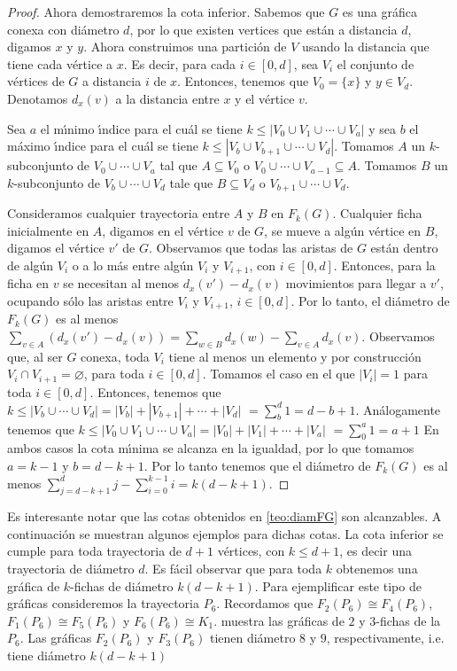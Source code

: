 \begin{proof}
Ahora demostraremos la cota inferior. Sabemos que $G$ es una gr\'afica conexa
con di\'ametro $d$, por lo que existen vertices que est\'an a distancia
$d$, digamos $x$ y $y$. Ahora construimos una partici\'on de $V$ usando  la
distancia que tiene cada v\'ertice a $x$. Es decir, para cada $i\in [0,d]$,
sea $V_{i}$ el conjunto de v\'ertices de $G$ a distancia $i$ de $x$. Entonces,
tenemos que $V_{0}=\{x\}$ y $y\in V_{d}$. Denotamos $d_x(v)$ a la distancia
entre $x$ y el v\'ertice $v$.

Sea $a$ el m\'\i{}nimo \'\i{}ndice para el cu\'al se tiene $k \leq |V_{0}\cup
V_{1}\cup \cdots \cup V_{a}|$ y sea $b$ el m\'aximo \'\i{}ndice para el cu\'al se
tiene $k\leq |V_{b}\cup V_{b+1}\cup \cdots \cup V_{d}|$. Tomamos $A$ un
$k$-subconjunto de $V_{0}\cup \cdots \cup V_{a}$  tal que $A\subseteq
V_{0}$ o $V_{0}\cup \cdots \cup V_{a-1}\subseteq A$. Tomamos $B$ un
$k$-subconjunto de $V_{b}\cup \cdots \cup V_{d}$ tale que
$B\subseteq V_{d}$ o $V_{b+1}\cup \cdots \cup V_{d}$. 

Consideramos cualquier trayectoria entre $A$ y $B$ en $F_{k}(G)$. Cualquier
ficha inicialmente en $A$, digamos en el v\'ertice $v$ de $G$, se mueve a
alg\'un v\'ertice en $B$, digamos el v\'ertice $v'$ de $G$. Observamos que todas
las aristas de $G$ est\'an dentro de alg\'un $V_{i}$ o a lo m\'as entre alg\'un
$V_{i}$ y $V_{i+1}$, con $i\in[0,d]$. Entonces, para la ficha en $v$ se
necesitan al menos $d_x(v')-d_x(v)$ movimientos para llegar a $v'$, ocupando
s\'olo las aristas entre $V_{i}$ y $V_{i+1}$, $i\in [0,d]$. Por lo tanto,
el di\'ametro de $F_{k}(G)$ es al menos $\sum_{v\in A}(d_x(v')-d_x(v))=
\sum_{w\in B}d_x(w)-\sum_{v\in A}d_x(v)$. Observamos que, al ser $G$ conexa,
toda $V_{i}$ tiene al menos un elemento y por construcci\'on $V_{i} \cap
V_{i+1}=\varnothing$, para toda $i\in [0,d]$. Tomamos el caso en el que
$|V_{i}|=1$ para toda $i\in [0,d]$. Entonces, tenemos que $k\leq
|V_{b}\cup\cdots\cup V_{d}|=|V_{b}|+|V_{b+1}|+\cdots +|V_d|$
$=\sum_{b}^{d}1 = d -b+1$. An\'alogamente tenemos que $k\leq
|V_{0}\cup V_{1}\cup \cdots \cup V_{a}|=|V_{0}|+|V_{1}|+\cdots + |V_{a}|$
$=\sum_{0}^{a} 1 = a+1$ En ambos casos la cota m\'\i{}nima se alcanza en la
igualdad, por lo que tomamos $a=k-1$ y $b=d-k+1$. Por lo tanto tenemos que
el di\'ametro de $F_{k}(G)$ es al menos $\sum_{j=d -k+1}^{d}j -
\sum_{i=0}^{k-1}i = k(d-k+1)$.
\end{proof}

Es interesante notar que las cotas obtenidos en \cref{teo:diamFG} son
alcanzables. A continuaci\'on se muestran algunos ejemplos para dichas cotas. La
cota inferior se cumple para toda trayectoria de $d +1$ v\'ertices, con $k \leq
d +1$, es decir una trayectoria de di\'ametro $d$. Es f\'acil observar que para
toda $k$ obtenemos una gr\'afica de $k$-fichas de di\'ametro $k(d-k+1)$. Para
ejemplificar este tipo de gr\'aficas consideremos la trayectoria $P_6$.
Recordamos que $F_2(P_6) \cong F_4(P_6)$, $F_1(P_6) \cong F_5(P_6)$ y $F_6(P_6)
\cong K_1$.  muestra las gr\'aficas de $2$ y
$3$-fichas de la $P_6$. Las gr\'aficas $F_2(P_6)$ y $F_3(P_6)$ tienen di\'ametro
$8$ y $9$, respectivamente, i.e. tiene di\'ametro $k(d-k+1)$

